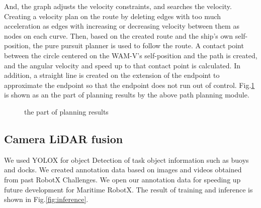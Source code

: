 \documentclass[lettersize,journal]{IEEEtran}
\begin{document}
And, the graph adjusts the velocity constraints, and searches the velocity.
Creating a velocity plan on the route by deleting edges with too much acceleration as edges with increasing or decreasing velocity between them as nodes on each curve.
Then, based on the created route and the ship's own self-position, the pure pursuit planner is used to follow the route.
A contact point between the circle centered on the WAM-V's self-position and the path is created, and the angular velocity and speed up to that contact point is calculated.
In addition, a straight line is created on the extension of the endpoint to approximate the endpoint so that the endpoint does not run out of control.
Fig.\ref{fig:the part of planning results} is shown as an the part of planning results by the above path planning module.
\begin{figure}[H]
  \begin{center}
  \end{center}
  \caption{the part of planning results}
  \label{fig:the part of planning results}
\end{figure}

\subsection{Camera LiDAR fusion}
We used  YOLOX\cite{YOLOX} for object Detection of task object information such as buoys and docks.
We created annotation data based on images and videos obtained from past RobotX Challenges.
We open our annotation data for speeding up future development for Maritime RobotX. \cite{dataset_annotations}
The result of training and inference is shown in Fig.\ref{fig:inference}.
\end{document}
